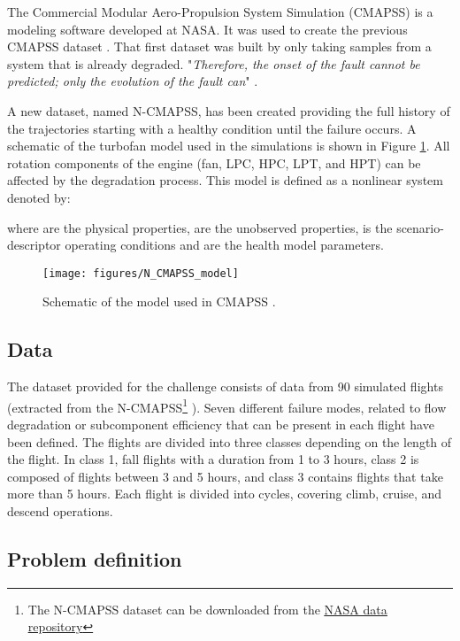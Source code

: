 \documentclass[PHM, 2021]{PHMSociety}
\begin{document}
The Commercial Modular Aero-Propulsion System Simulation (CMAPSS) is a modeling software developed at NASA. It was used to create the previous CMAPSS dataset \cite{saxena2008damage}. That first dataset was built by only taking samples from a system that is already degraded. "\emph{Therefore, the onset of the fault cannot be predicted; only the evolution of the fault can}" \cite{arias2021aircraft}. 

A new dataset, named N-CMAPSS, has been created providing the full history of the trajectories starting with a healthy condition until the failure occurs. A schematic of the turbofan model used in the simulations is shown in Figure \ref{fig:cmapss_model}. All rotation components of the engine (fan, LPC, HPC, LPT, and HPT) can be affected by the degradation process. This model is defined as a nonlinear system denoted by:



where  are the physical properties,  are the unobserved properties,  is the scenario-descriptor operating conditions and  are the health model parameters.

\begin{figure}[t]
\centering
\texttt{[image: figures/N\_CMAPSS\_model]}
\caption[Schematic of the model used in CMAPSS.]{Schematic of the model used in CMAPSS \cite{arias2021aircraft}.}
\label{fig:cmapss_model}
\end{figure}

\subsection{Data}

The dataset provided for the challenge consists of data from 90 simulated flights (extracted from the N-CMAPSS\footnote{The N-CMAPSS dataset can be downloaded from the \href{https://ti.arc.nasa.gov/tech/dash/groups/pcoe/prognostic-data-repository/\#turbofan-2}{\underline{NASA data repository}}} \cite{arias2021aircraft}). Seven different failure modes, related to flow degradation or subcomponent efficiency that can be present in each flight have been defined. The flights are divided into three classes depending on the length of the flight. In class 1, fall flights with a duration from 1 to 3 hours, class 2 is composed of flights between 3 and 5 hours, and class 3 contains flights that take more than 5 hours. Each flight is divided into cycles, covering climb, cruise, and descend operations.

\subsection{Problem definition}
\end{document}
